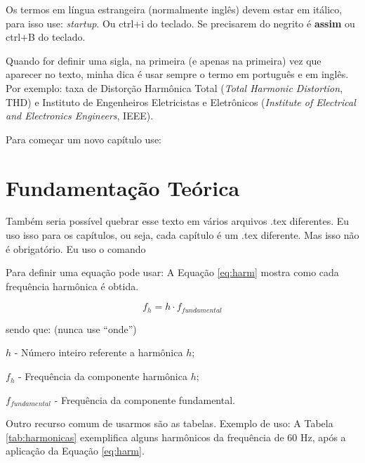 \documentclass[
	12pt,				%
	openright,			%
	oneside,			%
	a4paper,			%
	chapter=TITLE,		%
	section=TITLE,		%
	subsection=TITLE,	%
	subsubsection=TITLE,%
    subsubsubsection=TITLE,%
	english,			%
    french,
    spanish,
	brazil				%
	]{utfprtex2}
\begin{document}
Os termos em língua estrangeira (normalmente inglês) devem estar em itálico, para isso use: \textit{startup}. Ou ctrl+i do teclado. Se precisarem do negrito é \textbf{assim} ou ctrl+B do teclado.


Quando for definir uma sigla, na primeira (e apenas na primeira) vez que aparecer no texto, minha dica é usar sempre o termo em português e em inglês. Por exemplo: taxa de Distorção Harmônica Total (\textit{Total Harmonic Distortion}, THD) e Instituto de Engenheiros Eletricistas e Eletrônicos (\textit{Institute of Electrical and Electronics Engineers}, IEEE).

Para começar um novo capítulo use:


\chapter{Fundamentação Teórica}
\label{chap:revisao}

Também seria possível quebrar esse texto em vários arquivos .tex diferentes. Eu uso isso para os capítulos, ou seja, cada capítulo é um .tex diferente. Mas isso não é obrigatório. Eu uso o comando %


Para definir uma equação pode usar: A Equação \ref{eq:harm} mostra como cada frequência harmônica é obtida.

\begin{equation}
\label{eq:harm}
f_{h}=h\cdot f_{fundamental}
\end{equation}

\vspace{0.5cm}
sendo que: (nunca use ``onde'')

$h$ - Número inteiro referente a harmônica $h$;

$f_h$ - Frequência da componente harmônica $h$;

$f_{fundamental}$ - Frequência da componente fundamental.

\vspace{1.5cm}


Outro recurso comum de usarmos são as tabelas. Exemplo de uso:
A Tabela \ref{tab:harmonicas} exemplifica alguns harmônicos da frequência de 60 Hz, após a aplicação da  Equação \ref{eq:harm}.
\end{document}
